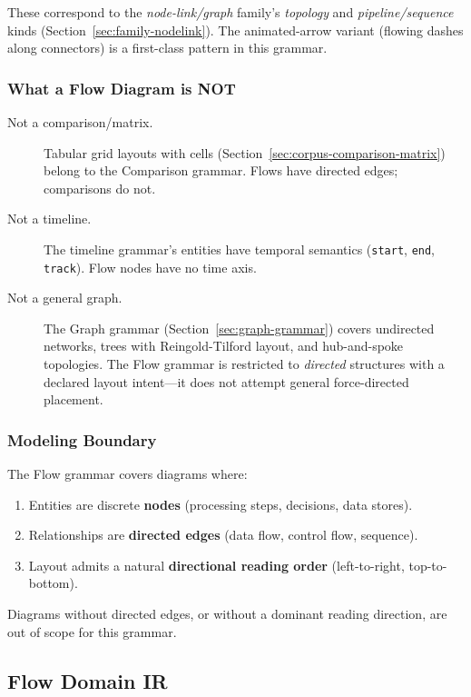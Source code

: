 These correspond to the \emph{node-link/graph} family's \emph{topology} and \emph{pipeline/sequence} kinds (Section~\ref{sec:family-nodelink}). The animated-arrow variant (flowing dashes along connectors) is a first-class pattern in this grammar.

\subsubsection{What a Flow Diagram is NOT}

\begin{description}
  \item[Not a comparison/matrix.] Tabular grid layouts with cells (Section~\ref{sec:corpus-comparison-matrix}) belong to the Comparison grammar. Flows have directed edges; comparisons do not.
  \item[Not a timeline.] The timeline grammar's entities have temporal semantics (\texttt{start}, \texttt{end}, \texttt{track}). Flow nodes have no time axis.
  \item[Not a general graph.] The Graph grammar (Section~\ref{sec:graph-grammar}) covers undirected networks, trees with Reingold-Tilford layout, and hub-and-spoke topologies. The Flow grammar is restricted to \emph{directed} structures with a declared layout intent---it does not attempt general force-directed placement.
\end{description}

\subsubsection{Modeling Boundary}

The Flow grammar covers diagrams where:
\begin{enumerate}
  \item Entities are discrete \textbf{nodes} (processing steps, decisions, data stores).
  \item Relationships are \textbf{directed edges} (data flow, control flow, sequence).
  \item Layout admits a natural \textbf{directional reading order} (left-to-right, top-to-bottom).
\end{enumerate}

Diagrams without directed edges, or without a dominant reading direction, are out of scope for this grammar.

\subsection{Flow Domain IR}
\label{sec:flow-domain-ir}

